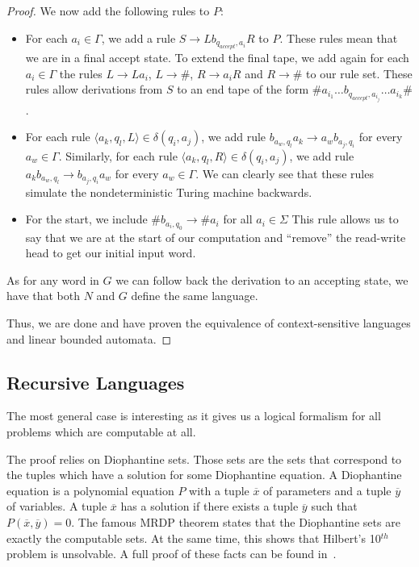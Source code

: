 \begin{proof}
    We now add the following rules to $P$:
    \begin{itemize}
        \setlength\itemsep{0.15em}
        \item For each $a_i \in \Gamma$, we add a rule $S \to Lb_{q_{accept}, a_i}R$ to $P$.
        These rules mean that we are in a final accept state.
        To extend the final tape, we add again for each $a_i \in \Gamma$ the rules $L \to La_i$, $L \to \#$, $R \to a_{i}R$ and $R \to \#$ to our rule set.
        These rules allow derivations from $S$ to an end tape of the form $\#a_{i_1}\dots b_{q_{accept}, a_{i_j}}\dots a_{i_k}\#$.
        \item For each rule $\langle a_k, q_l, L \rangle \in \delta(q_i, a_j)$, we add rule $b_{a_w, q_l}a_k \to a_{w}b_{a_j, q_i}$ for every $a_w \in \Gamma$.
        Similarly, for each rule $\langle a_k, q_l, R \rangle \in \delta(q_i, a_j)$, we add rule $a_{k}b_{a_w, q_l} \to b_{a_j, q_i}a_{w}$ for every $a_w \in \Gamma$.
        We can clearly see that these rules simulate the nondeterministic Turing machine backwards.
        \item For the start, we include $\#b_{a_i, q_0} \to \#a_i$ for all $a_i \in \Sigma$
        This rule allows us to say that we are at the start of our computation and ``remove'' the read-write head to get our initial input word.
    \end{itemize}
    As for any word in $G$ we can follow back the derivation to an accepting state, we have that both $N$ and $G$ define the same language.

    Thus, we are done and have proven the equivalence of context-sensitive languages and linear bounded automata.
\end{proof}


\subsection{Recursive Languages}\label{subsec:des-recursive-languages}

The most general case is interesting as it gives us a logical formalism for all problems which are computable at all.

The proof relies on Diophantine sets.
Those sets are the sets that correspond to the tuples which have a solution for some Diophantine equation.
A Diophantine equation is a polynomial equation $P$ with a tuple $\overline{x}$ of parameters and a tuple $\overline{y}$ of variables.
A tuple $\overline{x}$ has a solution if there exists a tuple $\overline{y}$ such that $P(\overline{x}, \overline{y}) = 0$.
The famous MRDP theorem states that the Diophantine sets are exactly the computable sets.
At the same time, this shows that Hilbert's 10$^{th}$ problem is unsolvable.
A full proof of these facts can be found in~\cite{Matijasevic1996}.

